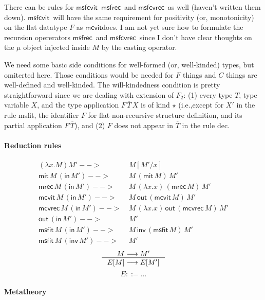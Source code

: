 \documentclass[a4paper,12pt]{book}
\newcommand{\ie}[0]{{i.e.},\;}
\newcommand{\miter}[0]{\ensuremath{\mathsf{mit}}}
\newcommand{\mrec}[0]{\ensuremath{\mathsf{mrec}}}
\newcommand{\mcvit}[0]{\ensuremath{\mathsf{mcvit}}}
\newcommand{\mcvrec}[0]{\ensuremath{\mathsf{mcvrec}}}
\newcommand{\msfit}[0]{\ensuremath{\mathsf{msfit}}}
\newcommand{\msfcvit}[0]{\ensuremath{\mathsf{msfcvit}}}
\newcommand{\msfrec}[0]{\ensuremath{\mathsf{msfrec}}}
\newcommand{\msfcvrec}[0]{\ensuremath{\mathsf{msfcvrec}}}
\newcommand{\In}[0]{\ensuremath{\mathsf{in}}}
\newcommand{\out}[0]{\ensuremath{\mathsf{out}}}
\newcommand{\Inv}[0]{\ensuremath{\mathsf{inv}}}
\begin{document}
There can be rules for \msfcvit\, \msfrec\ and \msfcvrec\ as well
(haven't written them down). \msfcvit\ will have the same requirement for
positivity (or, monotonicity) on the flat datatype $F$ as \mcvit does.
I am not yet sure how to formulate the recursion opererators \msfrec\ and
\msfcvrec\ since I don't have clear thoughts on the $\mu$ object injected
inside $M$ by the casting operator.



We need some basic side conditions for well-formed (or, well-kinded) types,
but omiterted here. Those conditions would be needed for $F$ things and $C$
things are well-defined and well-kinded. The will-kindedness condition is
pretty straightforward since we are dealing with extension of $F_2$:
(1) every type $T$,
    type variable $X$, and
    the type application $F\,\overline{T}\,X$
    is of kind $\star$
    (\ie except for $X'$ in the rule msfit,
          the identifier $F$ for flat non-recursive structure definition, and
          its partial application $F\,\overline{T}$), and
(2) $F$ does not appear in $\overline{T}$ in the rule dec.

\paragraph{Reduction rules}
\begin{align*}
(\lambda x.M) M' -->&~ M[M'/x] \\
\miter\,M\,(\In\,M') -->&~ M\,(\miter\,M)\,M' \\
\mrec\,M\,(\In\,M') -->&~ M\,(\lambda x.x)\,(\mrec\,M)\,M' \\
\mcvit\,M\,(\In\,M') -->&~ M\,\out\,(\mcvit\,M)\,M' \\
\mcvrec\,M\,(\In\,M') -->&~ M\,(\lambda x.x)\,\out\,(\mcvrec\,M)\,M' \\
\out\,(\In\,M') -->&~ M' \\
\msfit\,M\,(\In\,M') -->&~ M\,\Inv\,(\msfit\,M)\,M' \\
\msfit\,M\,(\Inv\,M') -->&~ M'
\end{align*}
\[ \inference{M --> M'}{E[M] --> E[M']} \]
\[ E ::= ... \]

\newpage
\paragraph{Metatheory}
\end{document}
